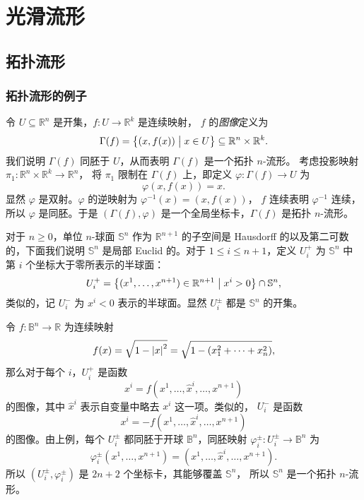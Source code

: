 
\chapter{光滑流形}

\section{拓扑流形}

\subsection{拓扑流形的例子}

\begin{example}[连续函数的图像]\label{exa:graph of continuous fuction}
  令 $U\subseteq\mathbb{R}^n$ 是开集，$f:U\to\mathbb{R}^k$ 是连续映射，
  $f$ 的\emph{图像}定义为
  \[
    \Gamma(f)=\bigl\{(x,f(x))\bigm| x\in U\bigr\} \subseteq\mathbb{R}^n\times\mathbb{R}^k. 
  \]
  我们说明 $\Gamma(f)$ 同胚于 $U$，从而表明 $\Gamma(f)$ 是一个拓扑 $n$-流形。
  考虑投影映射 $\pi_1:\mathbb{R}^n\times\mathbb{R}^k\to\mathbb{R}^n$，
  将 $\pi_1$ 限制在 $\Gamma(f)$ 上，即定义 $\varphi:\Gamma(f)\to U$ 为
  \[
    \varphi(x,f(x))=x.  
  \]
  显然 $\varphi$ 是双射。$\varphi$ 的逆映射为 $\varphi^{-1}(x)=(x,f(x))$，
  $f$ 连续表明 $\varphi^{-1}$ 连续，所以 $\varphi$ 是同胚。于是
  $(\Gamma(f),\varphi)$ 是一个全局坐标卡，$\Gamma(f)$ 是拓扑 $n$-流形。
\end{example}

\begin{example}[球面]\label{exa:topological sphere}
  对于 $n\geq 0$，单位 $n$-球面 $\mathbb{S}^n$ 作为 $\mathbb{R}^{n+1}$
  的子空间是 Hausdorff 的以及第二可数的，下面我们说明 $\mathbb{S}^n$
  是局部 Euclid 的。对于 $1\leq i\le n+1$，定义 $U_i^+$ 为 $\mathbb{S}^n$
  中第 $i$ 个坐标大于零所表示的半球面：
  \[
    U_i^+=\bigl\{ (x^1,\dots,x^{n+1})\in \mathbb{R}^{n+1}\bigm| x^i>0 \bigr\} 
    \cap\mathbb{S}^n ,
  \]
  类似的，记 $U_i^-$ 为 $x^i<0$ 表示的半球面。显然 $U_i^\pm$ 都是
  $\mathbb{S}^n$ 的开集。

  令 $f:\mathbb{B}^n\to\mathbb{R}$ 为连续映射
  \[
    f(x)=\sqrt{1-\left|x\right|^2}=\sqrt{1-(x_1^2+\cdots+x_n^2)},
  \]
  那么对于每个 $i$，$U_i^+$ 是函数
  \[
    x^i=f(x^1,\dots,\hat x^i,\dots,x^{n+1})  
  \]
  的图像，其中 $\hat{x}^i$ 表示自变量中略去 $x^i$ 这一项。类似的，
  $U_i^-$ 是函数
  \[
    x^i=-f(x^1,\dots,\hat x^i,\dots,x^{n+1})  
  \]
  的图像。由上例，每个 $U_i^\pm$ 都同胚于开球 $\mathbb{B}^n$，同胚映射
  $\varphi_i^\pm:U_i^\pm\to\mathbb{B}^n$ 为
  \[
    \varphi_i^\pm(x^1,\dots,x^{n+1})=(x^1,\dots,\hat x^i,\dots,x^{n+1}).  
  \]
  所以 $(U_i^\pm,\varphi_i^\pm)$ 是 $2n+2$ 个坐标卡，其能够覆盖 $\mathbb{S}^n$，
  所以 $\mathbb{S}^n$ 是一个拓扑 $n$-流形。
\end{example}

